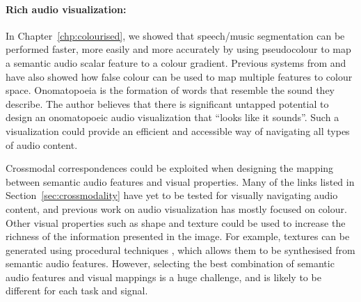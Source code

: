 \paragraph{Rich audio visualization:}

In Chapter~\ref{chp:colourised}, we showed that speech/music segmentation can be performed faster, more easily and more
accurately by using pseudocolour to map a semantic audio scalar feature to a colour gradient. Previous systems from
\citet{Tzanetakis2000} and \citet{Mason2007} have also showed how false colour can be used to map multiple features to
colour space.  Onomatopoeia is the formation of words that resemble the sound they describe.  The author believes that
there is significant untapped potential to design an onomatopoeic audio visualization that ``looks like it sounds''.
Such a visualization could provide an efficient and accessible way of navigating all types of audio content.

Crossmodal correspondences could be exploited when designing the mapping between semantic audio features and visual
properties.  Many of the links listed in Section~\ref{sec:crossmodality} have yet to be tested for visually navigating
audio content, and previous work on audio visualization has mostly focused on colour.  Other visual properties such as
shape and texture could be used to increase the richness of the information presented in the image.  For example,
textures can be generated using procedural techniques \citep{Ebert1994}, which allows them to be synthesised from
semantic audio features.  However, selecting the best combination of semantic audio features and visual mappings is a
huge challenge, and is likely to be different for each task and signal.



